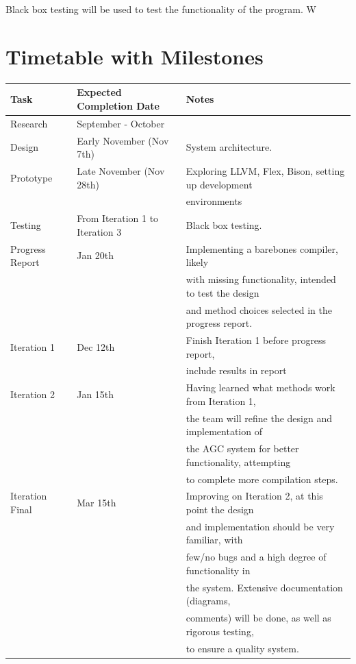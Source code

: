 \documentclass[11pt]{article}
\begin{document}
Black box testing will be used to test the functionality of the program. W


\section{Timetable with Milestones}

\begin{center}
\begin{tabular}{ |l | l | l|  }
 \hline
 \textbf{Task} & \textbf{Expected Completion Date} & \textbf{Notes} \\
 \hline 
 Research & September - October &  \\
 \hline 
 Design & Early November (Nov 7th)  & System architecture. \\
 \hline
 Prototype & Late November (Nov 28th) & Exploring LLVM, Flex, Bison, setting up development \\
 	    & & environments \\
 \hline
 Testing & From Iteration 1 to Iteration 3 & Black box testing. \\
 \hline
 Progress Report & Jan 20th & Implementing a barebones compiler, likely\\
 		 & & with missing functionality, intended to test the design \\
 		 & & and method choices selected in the progress report.\\
 \hline
 Iteration 1 & Dec 12th  & Finish Iteration 1 before progress report, \\
 		 & & include results in report\\
 \hline
 Iteration 2 & Jan 15th & Having learned what methods work from Iteration 1, \\
 		 & & the team will refine the design and implementation of \\ 		             		 & & the AGC system for better functionality, attempting \\
 		 & & to complete more compilation steps.\\
 \hline
 Iteration Final & Mar 15th & Improving on Iteration 2, at this point the design\\
 		 & & and implementation should be very familiar, with\\
 		 & & few/no bugs and a high degree of functionality in \\
 		 & & the system. Extensive documentation (diagrams, \\
 		 & & comments) will be done, as well as rigorous testing, \\
 		 & & to ensure a quality system.\\
 \hline
\end{tabular}
\end{center}
\end{document}
